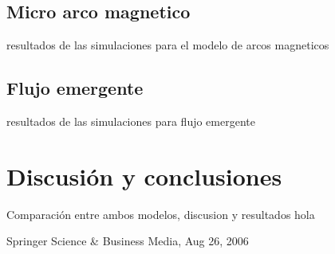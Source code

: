\documentclass[9pt]{book}
\begin{document}
\section{Micro arco magnetico}
resultados de las simulaciones para el modelo de arcos magneticos
\section{Flujo emergente}
resultados de las simulaciones para flujo emergente


\chapter{Discusi\'on y conclusiones}
Comparaci\'on entre ambos modelos, discusion y resultados
hola 




Springer Science \& Business Media, Aug 26, 2006
\end{document}
